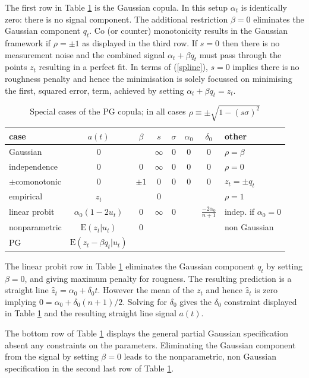 \documentclass[authoryear]{elsarticle}
\newcommand{\E}{\mathrm{E}}
\newcommand{\eref}[1]{(\ref{#1})}
\newcommand{\tref}[1]{Table \ref{#1}}
\begin{document}
The first row in \tref{pg} is the  Gaussian copula.  In this setup $\alpha_t$ is identically zero: there is no  signal component.  The additional restriction $\beta=0$ eliminates the Gaussian component $q_t$.  Co (or counter) monotonicity results in the Gaussian framework if $\rho=\pm 1$ as displayed in the third row.
If $s= 0$ then there is no measurement noise and the combined signal $\alpha_t+\beta q_t$ must pass through the points $z_t$ resulting in a perfect fit.   In terms of \eref{spline}, $s=0$ implies there is no roughness penalty and hence the minimisation is solely focussed on minimising the first, squared error, term, achieved  by setting $\alpha_t+\beta q_t=z_t$. 
 
 \begin{table}[htdp]
\caption{Special cases of the PG copula; in all cases $\rho\equiv\pm\sqrt{1-(s\sigma)^2}$}\label{pg}
\begin{center}
\begin{tabular}{l|c|ccccc|l}
\hline
case& $a(t)$ & $\beta$ &$s$ & $\sigma$ & $\alpha_0$&$\delta_0$  & other\\
\hline
Gaussian & 0 &  & $\infty$ & $0$&  0&0 &$\rho=\beta$\\
independence &  0 & 0 & $\infty$&0 & 0 &0 &$\rho=0$\\
$\pm$comonotonic  & 0 &$\pm 1$ &0 & 0 &0 & 0 &$z_t=\pm q_t$  \\
empirical  & $z_t$ &  & $0$  &  &   &  &$\rho=1$ \\ 
linear probit &$\alpha_0(1-2u_t)$&  0 &  $\infty$ &0& & $\frac{-2\alpha_0}{n+1}$ &indep. if $\alpha_0=0$\\
nonparametric & $\E(z_t|u_t)$  & 0 & & & &  & non Gaussian \\
PG & $\E(z_t-\beta q_t|u_t)$ & & & & & &  \\
\hline
\end{tabular}
\end{center}
\end{table}%

The linear probit row in \tref{pg}  eliminates the Gaussian component $q_t$ by setting $\beta=0$, and giving maximum penalty for rougness.   The resulting prediction  is a straight line $\hat z_t=\alpha_0+\delta_0 t$.  However the mean of the $z_t$ and hence $\hat z_t$ is zero implying $0=\alpha_0 + \delta_0(n+1)/2$.   Solving for $\delta_0$ gives the $\delta_0$ constraint displayed in \tref{pg} and the resulting straight line signal $a(t)$.

The bottom row of \tref{pg} displays the general partial Gaussian specification absent  any constraints on the parameters.  Eliminating the Gaussian component from the signal by setting $\beta=0$ leads to the nonparametric, non Gaussian specification in the second last row of \tref{pg}.
\end{document}
